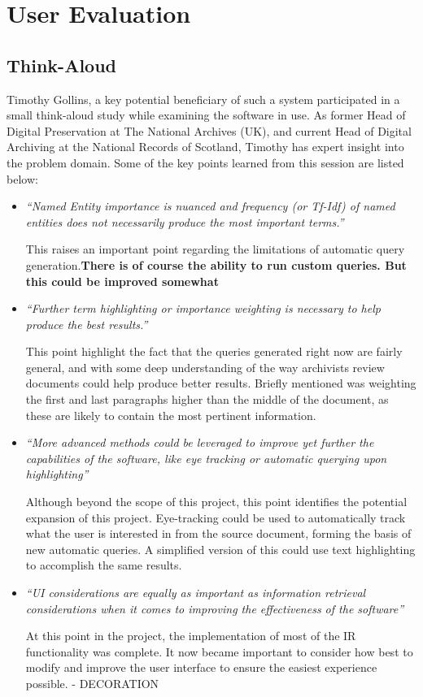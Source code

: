 \documentclass{l4proj}
\begin{document}
\section{User Evaluation} \label{userevaluation}
\subsection{Think-Aloud}
Timothy Gollins, a key potential beneficiary of such a system participated in a small think-aloud study while examining the software in use. As former Head of Digital Preservation at The National Archives (UK), and current Head of Digital Archiving at the National Records of Scotland, Timothy has expert insight into the problem domain.
Some of the key points learned from this session are listed below:

\begin{itemize}
\item \textit{``Named Entity importance is nuanced and frequency (or Tf-Idf) of named entities does not necessarily produce the most important terms.''}
\par
This raises an important point regarding the limitations of automatic query generation.\textbf{There is of course the ability to run custom queries. But this could be improved somewhat}

\item \textit{``Further term highlighting or importance weighting is necessary to help produce the best results.''}
\par
This point highlight the fact that the queries generated right now are fairly general, and with some deep understanding of the way archivists review documents could help produce better results. Briefly mentioned was weighting the first and last paragraphs higher than the middle of the document, as these are likely to contain the most pertinent information.

\item \textit{``More advanced methods could be leveraged to improve yet further the capabilities of the software, like eye tracking or automatic querying upon highlighting''}
\par
Although beyond the scope of this project, this point identifies the potential expansion of this project. Eye-tracking could be used to automatically track what the user is interested in from the source document, forming the basis of new automatic queries. A simplified version of this could use text highlighting to accomplish the same results.

\item \textit{``UI considerations are equally as important as information retrieval considerations when it comes to improving the effectiveness of the software''}
\par
At this point in the project, the implementation of most of the IR functionality was complete. It now became important to consider how best to modify and improve the user interface to ensure the easiest experience possible. - DECORATION
\end{itemize}
\end{document}
